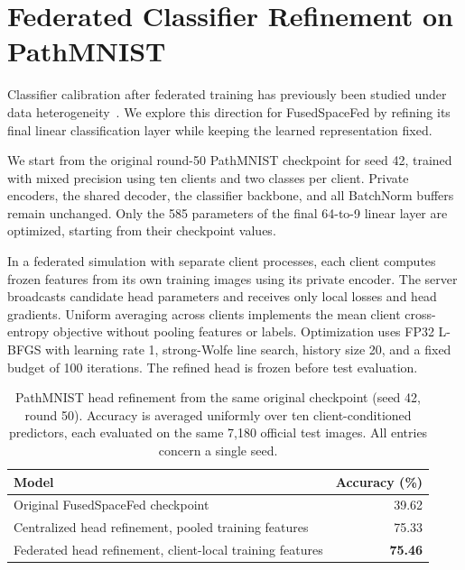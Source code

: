 \clearpage
\section{Federated Classifier Refinement on PathMNIST}
\label{app:pathmnist_head_refinement}

Classifier calibration after federated training has previously been studied
under data heterogeneity~\citep{luo2021nofear}. We explore this direction for
FusedSpaceFed by refining its final linear classification layer while keeping
the learned representation fixed.

We start from the original round-50 PathMNIST checkpoint for seed 42,
trained with mixed precision using ten clients and two classes per client.
Private encoders, the shared decoder, the classifier backbone, and all
BatchNorm buffers remain unchanged. Only the 585 parameters of the final
64-to-9 linear layer are optimized, starting from their checkpoint values.

In a federated simulation with separate client processes, each client computes
frozen features from its own training images using its private encoder.
The server broadcasts candidate head parameters and receives only local losses
and head gradients. Uniform averaging across clients implements the mean
client cross-entropy objective without pooling features or labels.
Optimization uses FP32 L-BFGS with learning rate 1, strong-Wolfe line search,
history size 20, and a fixed budget of 100 iterations. The refined head is
frozen before test evaluation.

\newpage
\begin{table}[ht]
\coauthorcolor
\centering
\caption{PathMNIST head refinement from the same original checkpoint
(seed 42, round 50). Accuracy is averaged uniformly over ten
client-conditioned predictors, each evaluated on the same 7,180 official
test images. All entries concern a single seed.}
\label{tab:pathmnist_head_refinement}
\begin{tabular}{@{}p{}r@{}}
\toprule
Model & Accuracy (\%) \\
\midrule
Original FusedSpaceFed checkpoint & 39.62 \\
Centralized head refinement, pooled training features & 75.33 \\
Federated head refinement, client-local training features & \textbf{75.46} \\
\bottomrule
\end{tabular}
\end{table}

